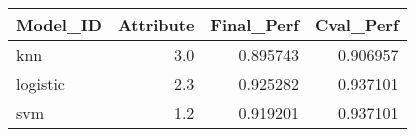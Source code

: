 \begin{tabular}{lrrr}
\toprule
Model\_ID &  Attribute &  Final\_Perf &  Cval\_Perf \\
\midrule
     knn &        3.0 &    0.895743 &   0.906957 \\
logistic &        2.3 &    0.925282 &   0.937101 \\
     svm &        1.2 &    0.919201 &   0.937101 \\
\bottomrule
\end{tabular}
